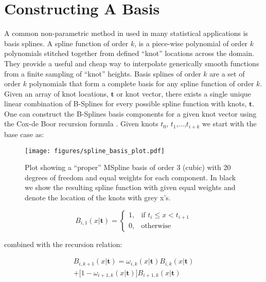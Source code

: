 \section{Constructing A Basis} \label{sec:basis_splines}

A common non-parametric method in used in many statistical applications is basis splines. A spline function of order $k$, 
is a piece-wise polynomial of order $k$ polynomials stitched together from defined ``knot'' locations across the domain. 
They provide a useful and cheap way to interpolate generically smooth functions from a finite sampling of ``knot'' heights. 
Basis splines of order $k$ are a set of order $k$ polynomials that form a complete basis for any spline function of order $k$. 
Given an array of knot locations, $\mathbf{t}$ or knot vector, there exists a single unique linear combination of B-Splines for 
every possible spline function with knots, $\mathbf{t}$. One can construct the B-Splines basis components for a given knot vector 
using the Cox-de Boor recursion formula \cite{deBoor78}. Given knots $t_0$, $t_1$,...,$t_{i+k}$ we start with the base case as:

\begin{figure}[ht!]
        \texttt{[image: figures/spline\_basis\_plot.pdf]}
        \caption{Plot showing a ``proper'' MSpline basis of order 3 (cubic) with 20 degrees of freedom and equal weights for each component. 
        In black we show the resulting spline function with given equal weights and denote the location of the knots with grey x's.}
        \label{fig:spline_basis}
\end{figure}

\begin{equation}
    B_{i,1}(x | \mathbf{t}) = 
    \begin{cases}
        1, & \text{if } t_i \leq x < t_{i+1} \\
        0, & \text{otherwise}
    \end{cases}
\end{equation}

\noindent combined with the recursion relation:

\begin{multline*}
    B_{i,k+1}(x | \mathbf{t}) = \omega_{i,k}(x | \mathbf{t})B_{i,k}(x | \mathbf{t})\\
                                + \big[1-\omega_{i+1,k}(x | \mathbf{t})\big] B_{i+1,k}(x | \mathbf{t})
\end{multline*}

